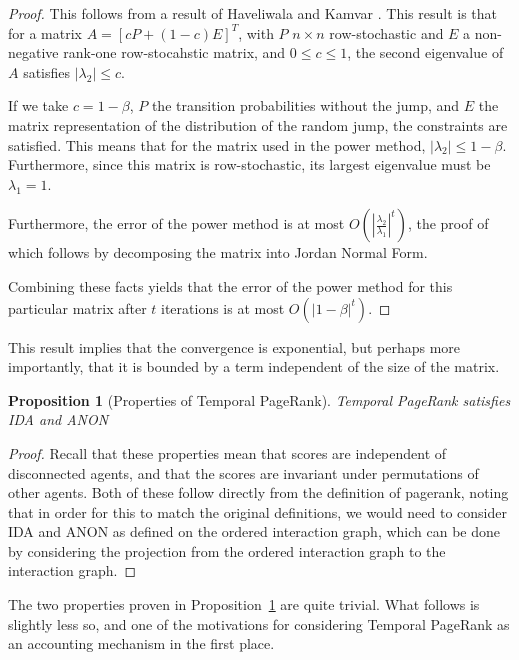 \documentclass[a4paper,11pt]{book}
\newtheorem{proposition}{Proposition}
\theoremstyle{definition}
\begin{document}
\begin{proof}
    This follows from a result of Haveliwala and Kamvar \cite{haveliwala2003second}. This
    result is that for a matrix $A = [cP + (1-c)E]^T$, with $P$ $n \times n$ row-stochastic
    and $E$ a non-negative rank-one row-stocahstic matrix, and $0 \leq c \leq 1$, the
    second eigenvalue of $A$ satisfies $|\lambda_2| \leq c$. 

    If we take $c=1-\beta$, $P$ the transition probabilities without the jump, and $E$ the
    matrix representation of the distribution of the random jump, the constraints are satisfied.
    This means that for the matrix used in the power method, $|\lambda_2| \leq 1-\beta$.
    Furthermore, since this matrix is row-stochastic, its largest eigenvalue must be $\lambda_1=1$.

    Furthermore, the error of the power method is at most $O\left(\left|\frac{\lambda_2}{\lambda_1}\right|^t\right)$,
    the proof of which follows by decomposing the matrix into Jordan Normal Form.

    Combining these facts yields that the error of the power method for this particular matrix
    after $t$ iterations is at most $O(|1-\beta|^t)$. 
\end{proof}

This result implies that the convergence is exponential, but perhaps more importantly, that it is bounded
by a term independent of the size of the matrix. 

\begin{proposition}[Properties of Temporal PageRank]
    Temporal PageRank satisfies IDA and ANON  
    \label{prop:prop_temp_pr}
\end{proposition}

\begin{proof}
    Recall that these properties mean that scores are independent of disconnected agents, and that
    the scores are invariant under permutations of other agents. Both of these follow directly
    from the definition of pagerank, noting that in order for this to match the original definitions,
    we would need to consider IDA and ANON as defined on the ordered interaction graph, which can
    be done by considering the projection from the ordered interaction graph to the interaction graph.
\end{proof}

The two properties proven in Proposition~\ref{prop:prop_temp_pr} are quite trivial. What follows
is slightly less so, and one of the motivations for considering Temporal PageRank as an accounting
mechanism in the first place.
\end{document}
